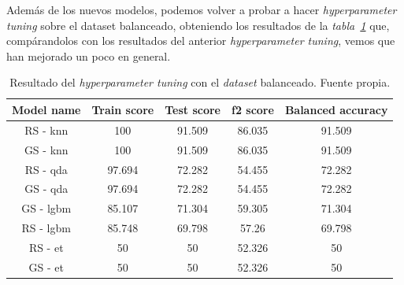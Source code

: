 Además de los nuevos modelos, podemos volver a probar a hacer \textit{hyperparameter tuning} sobre el dataset balanceado, obteniendo los resultados de la \textit{tabla\ \ref{tab:hyperparameter-tuning-results-v2}} que, compárandolos con los resultados del anterior \textit{hyperparameter tuning}, vemos que han mejorado un poco en general.

\begin{table}[!ht]
    \centering
    \begin{tabular}{|c|cccc|} \hline
        Model name & Train score & Test score & f2 score & Balanced accuracy \\ \hline
        RS - knn & 100 & 91.509 & 86.035 & 91.509 \\
        GS - knn & 100 & 91.509 & 86.035 & 91.509 \\
        RS - qda & 97.694 & 72.282 & 54.455 & 72.282 \\
        GS - qda & 97.694 & 72.282 & 54.455 & 72.282 \\
        GS - lgbm & 85.107 & 71.304 & 59.305 & 71.304 \\
        RS - lgbm & 85.748 & 69.798 & 57.26 & 69.798 \\
        RS - et & 50 & 50 & 52.326 & 50 \\
        GS - et & 50 & 50 & 52.326 & 50 \\ \hline
    \end{tabular}
    \caption{Resultado del \textit{hyperparameter tuning} con el \textit{dataset} balanceado. Fuente propia.}\ \label{tab:hyperparameter-tuning-results-v2}
\end{table}